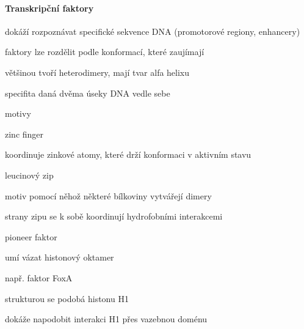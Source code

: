 \documentclass[DIV=8]{scrreprt}
\begin{document}
\paragraph{Transkripční faktory}
\begin{myItemize}[nosep]
    \item dokáží rozpoznávat specifické sekvence DNA (promotorové regiony, enhancery)
    \item faktory lze rozdělit podle konformací, které zaujímají
\begin{myItemize}[nosep]
    \item většinou tvoří heterodimery, mají tvar alfa helixu
    \item specifita daná dvěma úseky DNA vedle sebe
    \item motivy
\begin{myItemize}[nosep]
    \item zinc finger
\begin{myItemize}[nosep]
    \item koordinuje zinkové atomy, které drží konformaci v aktivním stavu
\end{myItemize}

    \item leucinový zip
\begin{myItemize}[nosep]
    \item motiv pomocí něhož některé bílkoviny vytvářejí dimery
    \item strany zipu se k sobě koordinují hydrofobními interakcemi
\end{myItemize}

\end{myItemize}

\end{myItemize}

    \item pioneer faktor
\begin{myItemize}[nosep]
    \item umí vázat histonový oktamer
    \item např. faktor FoxA
\begin{myItemize}[nosep]
    \item strukturou se podobá histonu H1
    \item dokáže napodobit interakci H1 přes vazebnou doménu
\end{myItemize}

\end{myItemize}

\end{myItemize}
\end{document}
